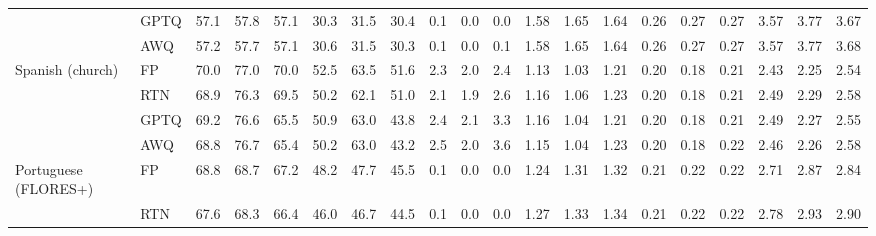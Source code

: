 \begin{landscape}
\begin{longtable}{llrrrrrrrrrrrrrrrrrr}
 & GPTQ & \cellcolor{loss!2}57.1 & \cellcolor{loss!4}57.8 & \cellcolor{loss!2}57.1 & \cellcolor{loss!2}30.3 & \cellcolor{loss!1}31.5 & \cellcolor{loss!2}30.4 & 0.1 & 0.0 & \cellcolor{loss!0}0.0 & \cellcolor{loss!1}1.58 & \cellcolor{loss!1}1.65 & \cellcolor{loss!1}1.64 & 0.26 & 0.27 & 0.27 & \cellcolor{loss!0}3.57 & \cellcolor{loss!0}3.77 & \cellcolor{loss!0}3.67 \\
 & AWQ & \cellcolor{loss!1}57.2 & \cellcolor{loss!5}57.7 & \cellcolor{loss!2}57.1 & \cellcolor{loss!0}30.6 & \cellcolor{loss!0}31.5 & \cellcolor{loss!3}30.3 & 0.1 & 0.0 & \cellcolor{loss!3}0.1 & \cellcolor{loss!0}1.58 & \cellcolor{loss!1}1.65 & \cellcolor{loss!1}1.64 & 0.26 & 0.27 & 0.27 & \cellcolor{loss!0}3.57 & \cellcolor{loss!0}3.77 & \cellcolor{loss!0}3.68 \\
\midrule
Spanish (church) & FP & 70.0 & 77.0 & 70.0 & 52.5 & 63.5 & 51.6 & 2.3 & 2.0 & 2.4 & 1.13 & 1.03 & 1.21 & 0.20 & 0.18 & 0.21 & 2.43 & 2.25 & 2.54 \\
 & RTN & \cellcolor{loss!14}68.9 & \cellcolor{loss!8}76.3 & \cellcolor{loss!7}69.5 & \cellcolor{loss!16}50.2 & \cellcolor{loss!10}62.1 & \cellcolor{loss!5}51.0 & 2.1 & 1.9 & \cellcolor{loss!4}2.6 & \cellcolor{loss!2}1.16 & \cellcolor{loss!2}1.06 & \cellcolor{loss!1}1.23 & 0.20 & 0.18 & 0.21 & \cellcolor{loss!0}2.49 & \cellcolor{loss!0}2.29 & \cellcolor{loss!0}2.58 \\
 & GPTQ & \cellcolor{loss!10}69.2 & \cellcolor{loss!5}76.6 & \cellcolor{loss!59}65.5 & \cellcolor{loss!11}50.9 & \cellcolor{loss!4}63.0 & \cellcolor{loss!56}43.8 & \cellcolor{loss!2}2.4 & \cellcolor{loss!2}2.1 & \cellcolor{loss!18}3.3 & \cellcolor{loss!2}1.16 & \cellcolor{loss!1}1.04 & \cellcolor{loss!0}1.21 & 0.20 & 0.18 & \cellcolor{loss!0}0.21 & \cellcolor{loss!0}2.49 & \cellcolor{loss!0}2.27 & \cellcolor{loss!0}2.55 \\
 & AWQ & \cellcolor{loss!16}68.8 & \cellcolor{loss!4}76.7 & \cellcolor{loss!60}65.4 & \cellcolor{loss!16}50.2 & \cellcolor{loss!4}63.0 & \cellcolor{loss!60}43.2 & \cellcolor{loss!4}2.5 & \cellcolor{loss!1}2.0 & \cellcolor{loss!22}3.6 & \cellcolor{loss!1}1.15 & \cellcolor{loss!1}1.04 & \cellcolor{loss!2}1.23 & 0.20 & 0.18 & \cellcolor{loss!2}0.22 & \cellcolor{loss!0}2.46 & \cellcolor{loss!0}2.26 & \cellcolor{loss!0}2.58 \\
\midrule
Portuguese (FLORES+) & FP & 68.8 & 68.7 & 67.2 & 48.2 & 47.7 & 45.5 & 0.1 & 0.0 & 0.0 & 1.24 & 1.31 & 1.32 & 0.21 & 0.22 & 0.22 & 2.71 & 2.87 & 2.84 \\
 & RTN & \cellcolor{loss!15}67.6 & \cellcolor{loss!4}68.3 & \cellcolor{loss!11}66.4 & \cellcolor{loss!16}46.0 & \cellcolor{loss!7}46.7 & \cellcolor{loss!7}44.5 & 0.1 & 0.0 & 0.0 & \cellcolor{loss!2}1.27 & \cellcolor{loss!1}1.33 & \cellcolor{loss!1}1.34 & 0.21 & 0.22 & 0.22 & \cellcolor{loss!0}2.78 & \cellcolor{loss!0}2.93 & \cellcolor{loss!0}2.90 \\

\end{longtable}
\end{landscape}
